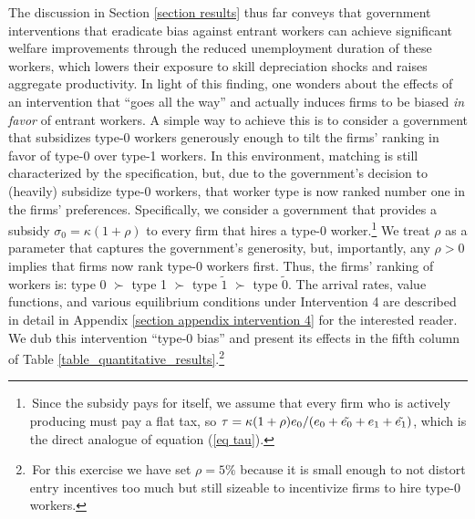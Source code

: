 \documentclass[12pt]{article} %
\theoremstyle{definition}
\begin{document}
The discussion in Section \ref{section results} thus far conveys that government interventions that eradicate bias against entrant workers can achieve significant welfare improvements through the reduced unemployment duration of these workers, which lowers their exposure to skill depreciation shocks and raises aggregate productivity.
In light of this finding, one wonders about the effects of an intervention that ``goes all the way'' and actually induces firms to be biased \textit{in favor} of entrant workers.
A simple way to achieve this is to consider a government that subsidizes type-0 workers generously enough to tilt the firms' ranking in favor of type-0 over type-1 workers. 
In this environment, matching is still characterized by the \cite{petrongolo2001looking} specification, but, due to the government's decision to (heavily) subsidize type-0 workers, that worker type is now ranked number one in the firms' preferences. Specifically, we consider a government that provides a subsidy $\sigma_0=\kappa(1+\rho)$ to every firm that hires a type-0 worker.\footnote{\,Since the subsidy pays for itself, we assume that every firm who is actively producing must pay a flat tax, so $\tau = \kappa(1+\rho)e_0/(e_0+ \Tilde{e_0}+e_1+\tilde{e_1})$, which is the direct analogue of equation (\ref{eq tau}).} We treat $\rho$ as a parameter that captures the government's generosity, but, importantly, any $\rho>0$ implies that firms now rank type-0 workers {first}. Thus, the firms' ranking of workers is: type $0$ $\succ$ type 1 $\succ$ type $\tilde{1}$ $\succ$ type $\tilde{0}$. The arrival rates, value functions, and various equilibrium conditions under Intervention 4 are described in detail in Appendix \ref{section appendix intervention 4} for the interested reader. 
We dub this intervention ``type-0 bias'' and present its effects in the fifth column of Table \ref{table_quantitative_results}.\footnote{\,For this exercise we have set $\rho = 5\%$ because it is small enough to not distort entry incentives too much but still sizeable to incentivize firms to hire type-0 workers.} 
\end{document}
